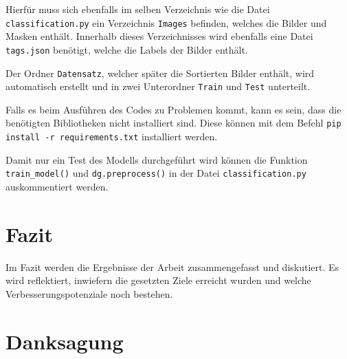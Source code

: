 \documentclass[journal,twoside,web]{ieeecolor}
\begin{document}
Hierfür muss sich ebenfalls im selben Verzeichnis wie die Datei \texttt{classification.py} ein Verzeichnis \texttt{Images} befinden, welches die Bilder und Masken enthält. Innerhalb dieses Verzeichnisses wird ebenfalls eine Datei \texttt{tags.json} benötigt, welche die Labels der Bilder enthält.

Der Ordner \texttt{Datensatz}, welcher später die Sortierten Bilder enthält, wird automatisch erstellt und in zwei Unterordner \texttt{Train} und \texttt{Test} unterteilt.

Falls es beim Ausführen des Codes zu Problemen kommt, kann es sein, dass die benötigten Bibliotheken nicht installiert sind. Diese können mit dem Befehl \texttt{pip install -r requirements.txt} installiert werden.

Damit nur ein Test des Modells durchgeführt wird können die Funktion \texttt{train\_model()} und \texttt{dg.preprocess()} in der Datei \texttt{classification.py} auskommentiert werden.


\section{Fazit}
Im Fazit werden die Ergebnisse der Arbeit zusammengefasst und diskutiert. Es wird reflektiert, inwiefern die gesetzten Ziele erreicht wurden und welche Verbesserungspotenziale noch bestehen.








\appendices


\section*{Danksagung}
\end{document}
